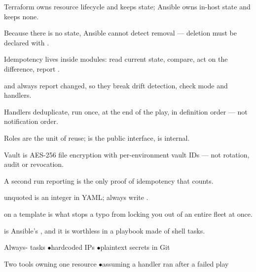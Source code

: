 
\begin{tickcheck}
  \item Terraform owns resource lifecycle and keeps state; Ansible owns in-host state and keeps none.
  \item Because there is no state, Ansible cannot detect removal --- deletion must be declared with .
  \item Idempotency lives inside modules: read current state, compare, act on the difference, report .
  \item {} and  always report changed, so they break drift detection, check mode and handlers.
  \item Handlers deduplicate, run once, at the end of the play, in definition order --- not notification order.
  \item Roles are the unit of reuse;  is the public interface,  is internal.
  \item Vault is AES-256 file encryption with per-environment vault IDs --- not rotation, audit or revocation.
\end{tickcheck}

\begin{wbitem}
  \item A second run reporting  is the only proof of idempotency that counts.
  \item {} unquoted is an integer in YAML; always write .
  \item {} on a template is what stops a typo from locking you out of an entire fleet at once.
  \item {} is Ansible's , and it is worthless in a playbook made of shell tasks.
\end{wbitem}

\begin{wbitem}
  \item Always- tasks \quad$\bullet$\quad hardcoded IPs \quad$\bullet$\quad plaintext secrets in Git
  \item Two tools owning one resource \quad$\bullet$\quad assuming a handler ran after a failed play
\end{wbitem}

